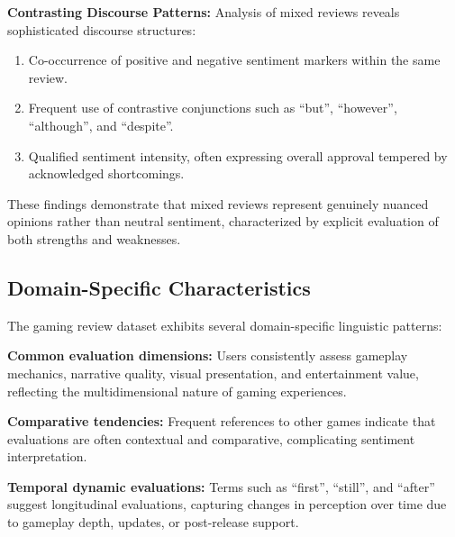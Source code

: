 \textbf{Contrasting Discourse Patterns:}  
Analysis of mixed reviews reveals sophisticated discourse structures:

\begin{enumerate}
    \item Co-occurrence of positive and negative sentiment markers within the same review.
    \item Frequent use of contrastive conjunctions such as ``but'', ``however'', ``although'', and ``despite''.
    \item Qualified sentiment intensity, often expressing overall approval tempered by acknowledged shortcomings.
\end{enumerate}

These findings demonstrate that mixed reviews represent genuinely nuanced opinions rather than neutral sentiment, characterized by explicit evaluation of both strengths and weaknesses.

\subsection{Domain-Specific Characteristics}

The gaming review dataset exhibits several domain-specific linguistic patterns:

\textbf{Common evaluation dimensions:}  
Users consistently assess gameplay mechanics, narrative quality, visual presentation, and entertainment value, reflecting the multidimensional nature of gaming experiences.

\textbf{Comparative tendencies:}  
Frequent references to other games indicate that evaluations are often contextual and comparative, complicating sentiment interpretation.

\textbf{Temporal dynamic evaluations:}  
Terms such as ``first'', ``still'', and ``after'' suggest longitudinal evaluations, capturing changes in perception over time due to gameplay depth, updates, or post-release support.
